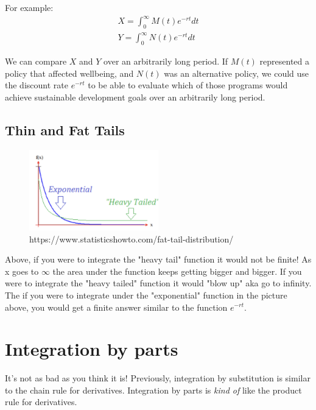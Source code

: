\documentclass{article}
\begin{document}
For example:
\begin{align}
    X = \int_0^\infty M(t) e^{-rt} dt\\
    Y = \int_0^\infty N(t) e^{-rt} dt
\end{align}

We can compare $X$ and $Y$ over an arbitrarily long period. If $M(t)$ represented a policy that affected wellbeing, and $N(t)$ was an alternative policy, we could use the discount rate $e^{-rt}$ to be able to evaluate which of those programs would achieve sustainable development goals over an arbitrarily long period.\\

\subsection{Thin and Fat Tails}


\begin{figure}[htp]
    \centering
        \includegraphics[width=0.5\textwidth]{Screen Shot 2023-10-04 at 10.56.06 AM.png}
    \caption{https://www.statisticshowto.com/fat-tail-distribution/}
\end{figure}

Above, if you were to integrate the "heavy tail" function it would not be finite! As x goes to $\infty$ the area under the function keeps getting bigger and bigger. If you were to integrate the "heavy tailed" function it would "blow up" aka go to infinity. \\

The if you were to integrate under the "exponential" function in the picture above, you would get a finite answer similar to the function $e^{-rt}$. \\

\section{Integration by parts}
It's not as bad as you think it is! Previously, integration by substitution is similar to the chain rule for derivatives. Integration by parts is \textit{kind of} like the product rule for derivatives. \\
\end{document}
